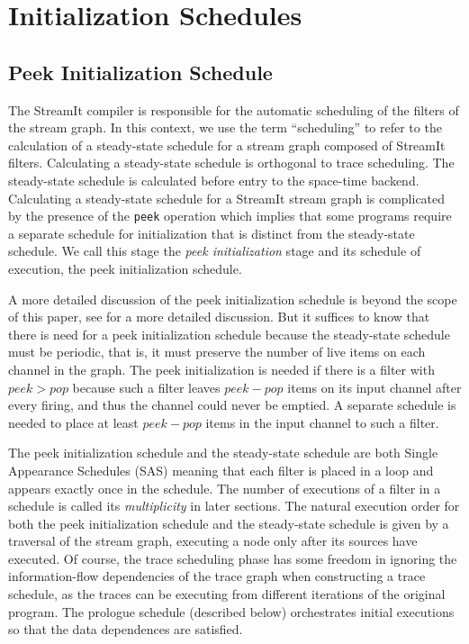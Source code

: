 \section{Initialization Schedules}
\subsection{Peek Initialization Schedule}
The StreamIt compiler is responsible for the automatic scheduling of
the filters of the stream graph. In this context, we use the term
``scheduling'' to refer to the calculation of a steady-state schedule for
a stream graph composed of StreamIt filters.  Calculating a
steady-state schedule is orthogonal to trace scheduling. The
steady-state schedule is calculated before entry to the space-time
backend.  Calculating a steady-state schedule for a StreamIt stream
graph is complicated by the presence of the {\tt peek} operation which
implies that some programs require a separate schedule for
initialization that is distinct from the steady-state schedule.  We
call this stage the {\it peek initialization} stage and its schedule
of execution, the {peek initialization schedule}.

A more detailed discussion of the peek initialization schedule is
beyond the scope of this paper, see \cite{streamitcc} for a more
detailed discussion.  But it suffices to know that there is
need for a peek initialization schedule because the steady-state schedule
must be periodic, that is, it must preserve the number of live items on
each channel in the graph.  The peek initialization is needed if there
is a filter with $peek > pop$ because such a filter leaves $peek -
pop$ items on its input channel after every firing, and thus the
channel could never be emptied.  A separate schedule is needed to
place at least $peek - pop$ items in the input channel to such a filter.

The peek initialization schedule and the steady-state schedule are
both Single Appearance Schedules (SAS) meaning that each filter is
placed in a loop and appears exactly once in the schedule.  The number
of executions of a filter in a schedule is called its {\it
multiplicity} in later sections.  The natural execution order for both
the peek initialization schedule and the steady-state schedule is
given by a traversal of the stream graph, executing a node only after
its sources have executed. Of course, the trace scheduling phase has
some freedom in ignoring the information-flow dependencies of the
trace graph when constructing a trace schedule, as the traces can be
executing from different iterations of the original program.  The
prologue schedule (described below) orchestrates initial executions so
that the data dependences are satisfied.

